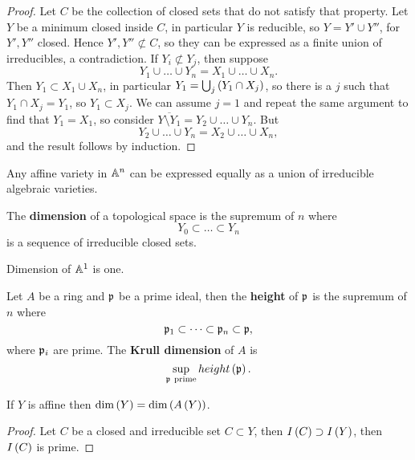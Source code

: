\begin{proof}
Let $ C $ be the collection of closed sets that do not satisfy that property. Let $ Y $ be a minimum closed inside $ C $, in particular $ Y $ is reducible, so $ Y = Y' \cup Y'' $, for $ Y', Y'' $ closed. Hence $ Y', Y'' \not\subset C $, so they can be expressed as a finite union of irreducibles, a contradiction. If $ Y_i \not\subset Y_j $, then suppose
$$ Y_1 \cup \dots \cup Y_n = X_1 \cup \dots \cup X_n. $$
Then $ Y_1 \subset X_1 \cup X_n $, in particular $ Y_1 = \bigcup_j \left( Y_1 \cap X_j \right) $, so there is a $ j $ such that $ Y_1 \cap X_j = Y_1 $, so $ Y_1 \subset X_j $. We can assume $ j = 1 $ and repeat the same argument to find that $ Y_1 = X_1 $, so consider $ \overline{Y \setminus Y_1} = Y_2 \cup \dots \cup Y_n $. But
$$ Y_2 \cup \dots \cup Y_n = X_2 \cup \dots \cup X_n, $$
and the result follows by induction.
\end{proof}

\begin{corollary}
Any affine variety in $ \mathbb{A}^n $ can be expressed equally as a union of irreducible algebraic varieties.
\end{corollary}

\begin{definition}
The \textbf{dimension} of a topological space is the supremum of $ n $ where
$$ Y_0 \subset \dots \subset Y_n $$
is a sequence of irreducible closed sets.
\end{definition}

\begin{example}
Dimension of $ \mathbb{A}^1 $ is one.
\end{example}

\begin{definition}
Let $ A $ be a ring and $ \mathfrak{p} $ be a prime ideal, then the \textbf{height} of $ \mathfrak{p} $ is the supremum of $ n $ where
$$ \mathfrak{p}_1 \subset \dots \subset \mathfrak{p}_n \subset \mathfrak{p}, $$
where $ \mathfrak{p}_i $ are prime. The \textbf{Krull dimension} of $ A $ is
$$ \sup_{\mathfrak{p} \ \text{prime}} height\left( \mathfrak{p} \right). $$
\end{definition}

\begin{proposition}
If $ Y $ is affine then $ \dim\left( Y \right) = \dim\left( A\left( Y \right) \right) $.
\end{proposition}

\begin{proof}
Let $ C $ be a closed and irreducible set $ C \subset Y $, then $ I\left( C \right) \supset I\left( Y \right) $, then $ I\left( C \right) $ is prime.
\end{proof}

